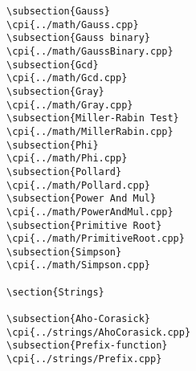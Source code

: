 {\begin{verbatim}
\subsection{Gauss}
\cpi{../math/Gauss.cpp}
\subsection{Gauss binary}
\cpi{../math/GaussBinary.cpp}
\subsection{Gcd}
\cpi{../math/Gcd.cpp}
\subsection{Gray}
\cpi{../math/Gray.cpp}
\subsection{Miller-Rabin Test}
\cpi{../math/MillerRabin.cpp}
\subsection{Phi}
\cpi{../math/Phi.cpp}
\subsection{Pollard}
\cpi{../math/Pollard.cpp}
\subsection{Power And Mul}
\cpi{../math/PowerAndMul.cpp}
\subsection{Primitive Root}
\cpi{../math/PrimitiveRoot.cpp}
\subsection{Simpson}
\cpi{../math/Simpson.cpp}

\section{Strings}

\subsection{Aho-Corasick}
\cpi{../strings/AhoCorasick.cpp}
\subsection{Prefix-function}
\cpi{../strings/Prefix.cpp}

\end{verbatim}}
